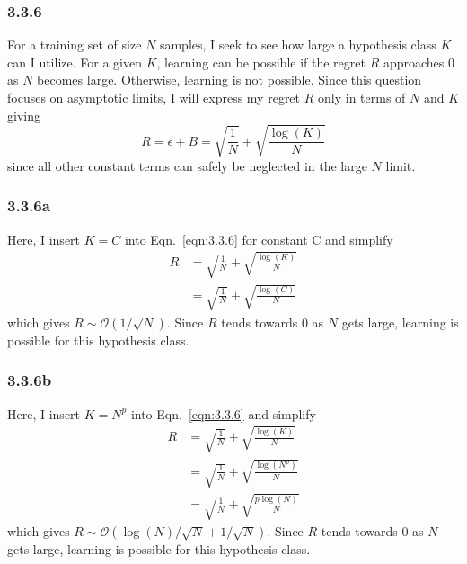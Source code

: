 \documentclass[12pt]{amsart}
\begin{document}
\subsubsection*{3.3.6}

For a training set of size $N$ samples, I seek to see how large a hypothesis class $K$ can I utilize.  For a given $K$, learning can be possible if the regret $R$ approaches 0 as $N$ becomes large.  Otherwise, learning is not possible.  Since this question focuses on asymptotic limits, I will express my regret $R$ only in terms of $N$ and $K$ giving
\begin{equation} \label{eqn:3.3.6}
R = \epsilon + B = \sqrt{\frac{1}{N}} + \sqrt{\frac{\log(K)}{N}}
\end{equation}
since all other constant terms can safely be neglected in the large $N$ limit.

\subsubsection*{3.3.6a}

Here, I insert $K = C$ into Eqn.~\ref{eqn:3.3.6} for constant C and simplify
\begin{equation}
\begin{split}
R & = \sqrt{\frac{1}{N}} + \sqrt{\frac{\log(K)}{N}} \\
& = \sqrt{\frac{1}{N}} + \sqrt{\frac{\log(C)}{N}}
\end{split}
\end{equation}
which gives $R {\sim} \mathcal{O}(1/\sqrt{N})$.  Since $R$ tends towards 0 as $N$ gets large, learning is possible for this hypothesis class.

\subsubsection*{3.3.6b}

Here, I insert $K = N^p$ into Eqn.~\ref{eqn:3.3.6} and simplify
\begin{equation}
\begin{split}
R & = \sqrt{\frac{1}{N}} + \sqrt{\frac{\log(K)}{N}} \\
& = \sqrt{\frac{1}{N}} + \sqrt{\frac{\log(N^p)}{N}} \\
& = \sqrt{\frac{1}{N}} + \sqrt{\frac{p\log(N)}{N}}
\end{split}
\end{equation}
which gives $R {\sim} \mathcal{O}(\log(N)/\sqrt{N} + 1/\sqrt{N})$.  Since $R$ tends towards 0 as $N$ gets large, learning is possible for this hypothesis class.
\end{document}
